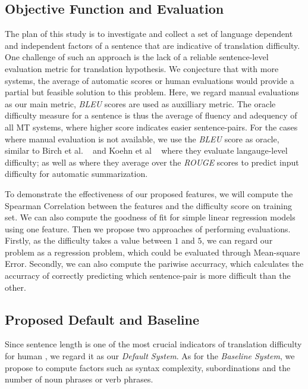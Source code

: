 \documentclass[11pt]{article}
\begin{document}
\subsection{Objective Function and Evaluation}
The plan of this study is to investigate and collect a set of language dependent and independent factors of a sentence that are indicative of translation difficulty. 
One challenge of such an approach is the lack of a reliable sentence-level evaluation metric for translation hypothesis. 
We conjecture that with more systems, the average of automatic scores or human evaluations would provide a partial but feasible solution to this problem.
Here, we regard manual evaluations as our main metric, \emph{BLEU} scores are used as auxilliary metric. 
The oracle difficulty measure for a sentence is thus the average of fluency and adequency of all MT systems, where higher score indicates easier sentence-pairs.
For the cases where manual evaluation is not available, we use the \emph{BLEU} score as oracle, similar to Birch et al. ~ and Koehn et al ~ where 
they evaluate langauge-level difficulty; as well as \cite{nenkova-louis:2008:ACLMain} where they average over the \emph{ROUGE} scores to predict input difficulty for automatic summarization. 

To demonstrate the effectiveness of our proposed features, we will compute the Spearman Correlation between the features and the difficulty score on training set.
We can also compute the goodness of fit for simple linear regression models using one feature. 
Then we propose two approaches of performing evaluations. 
Firstly, as the difficulty takes a value between $1$ and $5$, we can regard our problem as a regression problem, which could be evaluated through Mean-square Error.
Secondly, we can also compute the pariwise accurracy, which calculates the accurracy of correctly predicting which sentence-pair is more difficult than the other. 

\subsection{Proposed Default and Baseline}
Since sentence length is one of the most crucial indicators of translation difficulty for human \cite{mishra-bhattacharyya-carl:2013:Short}, we regard it as our \emph{Default System}. 
As for the \emph{Baseline System}, we propose to compute factors such as syntax complexity, subordinations and the number of noun phrases or verb phrases. 



\end{document}

